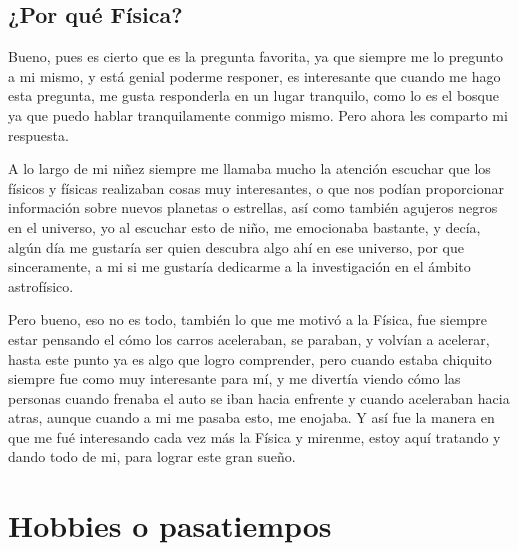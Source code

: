 \documentclass[letterpaper,12pt]{article}
\begin{document}
    \subsection{\Large{¿Por qué Física?}} \large{Bueno, pues es cierto que es la pregunta favorita, ya que siempre me lo pregunto a mi mismo, y está genial poderme responer, es interesante que cuando me hago esta pregunta, me gusta responderla en un lugar tranquilo, como lo es el bosque ya que puedo hablar tranquilamente conmigo mismo. Pero ahora les comparto mi respuesta. 
    
    A lo largo de mi niñez siempre me llamaba mucho la atención escuchar que los físicos y físicas realizaban cosas muy interesantes, o que nos podían proporcionar información sobre nuevos planetas o estrellas, así como también agujeros negros en el universo, yo al escuchar esto de niño, me emocionaba bastante, y decía, algún día me gustaría ser quien descubra algo ahí en ese universo, por que sinceramente, a mi si me gustaría dedicarme a la investigación en el ámbito astrofísico.
    
    Pero bueno, eso no es todo, también lo que me motivó a la Física, fue siempre estar pensando el cómo los carros aceleraban, se paraban, y volvían a acelerar, hasta este punto ya es algo que logro comprender, pero cuando estaba chiquito siempre fue como muy interesante para mí, y me divertía viendo cómo las personas cuando frenaba el auto se iban hacia enfrente y cuando aceleraban hacia atras, aunque cuando a mi me pasaba esto, me enojaba. Y así fue la manera en que me fué interesando cada vez más la Física y mirenme, estoy aquí tratando y dando todo de mi, para lograr este gran sueño.}
    
\section{\huge{Hobbies o pasatiempos }}
\end{document}
